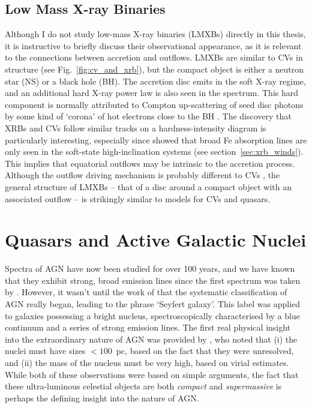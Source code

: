 \subsection{Low Mass X-ray Binaries}

Although I do not study low-mass X-ray binaries (LMXBs) 
directly in this thesis, it is instructive
to briefly discuss their observational appearance, 
as it is relevant to the connections between accretion and outflows.
LMXBs are similar to CVs in structure (see Fig.~\ref{fig:cv_and_xrb}), 
but the compact object is either a neutron star (NS) or a black hole (BH). 
The accretion disc 
emits in the soft X-ray regime, and an additional hard X-ray power law is also 
seen in the spectrum. This hard component is normally attributed
to Compton up-scattering of seed disc photons by some kind of `corona'
of hot electrons close to the BH \citep[e.g.][]{white1988,mitsuda1989,uttley2014}.
The discovery that XRBs and CVs follow similar 
tracks on a hardness-intensity diagram \citep[HID;][]{kordingDNjet2008}
is particularly interesting, especially since \cite{ponti2012}
showed that broad Fe absorption lines are only seen in the soft-state 
high-inclination systems (see section~\ref{sec:xrb_winds}). 
This implies that equatorial outflows may be intrinsic to 
the accretion process. Although the outflow driving mechanism
is probably different to CVs \citep[e.g.][]{diaztrigo2015}, 
the general structure of LMXBs -- that of a disc around a compact object with
an associated outflow -- is strikingly similar to models for CVs and quasars.




\section{Quasars and Active Galactic Nuclei}

Spectra of AGN have now been studied for over 100 years, and we have known 
that they exhibit strong, broad emission lines since the first spectrum was taken by
\cite{fath1909}. However, it wasn't until the work of \cite{seyfert1943} that the systematic 
classification of AGN really began, leading to the phrase `Seyfert galaxy'.
This label was applied to galaxies possessing a bright nucleus, spectroscopically
characterised by a blue continuum and a series of strong emission lines.
The first real physical insight into the extraordinary nature of AGN
was provided by \cite{woltjer1959}, who noted that 
(i) the nuclei must have sizes $<100$~pc,
based on the fact that they were unresolved, and (ii) the mass of the nucleus
must be very high, based on virial estimates. 
While both of these observations were based on simple arguments, the fact that these
ultra-luminous celestial objects are both {\em compact} and {\em supermassive}
is perhaps the defining insight into the nature of AGN.

